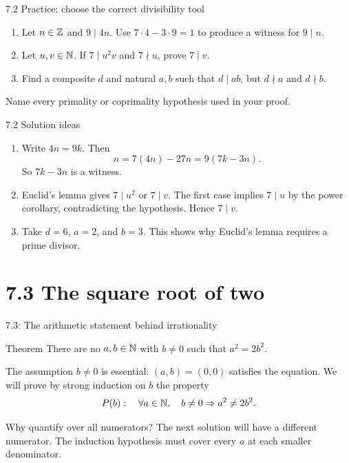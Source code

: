 \begin{frame}{7.2 Practice: choose the correct divisibility tool}
\begin{enumerate}
\item Let $n\in\mathbb{Z}$ and $9\mid4n$. Use $7\cdot4-3\cdot9=1$ to produce a witness for $9\mid n$.
\item Let $u,v\in\mathbb{N}$. If $7\mid u^2v$ and $7\nmid u$, prove $7\mid v$.
\item Find a composite $d$ and natural $a,b$ such that $d\mid ab$, but $d\nmid a$ and $d\nmid b$.
\end{enumerate}
Name every primality or coprimality hypothesis used in your proof.
\end{frame}

\begin{frame}{7.2 Solution ideas}
\begin{enumerate}
\item Write $4n=9k$. Then
\[
n=7(4n)-27n=9(7k-3n).
\]
So $7k-3n$ is a witness.
\item Euclid's lemma gives $7\mid u^2$ or $7\mid v$. The first case implies $7\mid u$ by the power corollary, contradicting the hypothesis. Hence $7\mid v$.
\item Take $d=6$, $a=2$, and $b=3$. This shows why Euclid's lemma requires a prime divisor.
\end{enumerate}
\end{frame}

\section{7.3 The square root of two}
\begin{frame}{7.3: The arithmetic statement behind irrationality}
\begin{block}{Theorem}
There are no $a,b\in\mathbb{N}$ with $b\ne0$ such that $a^2=2b^2$.
\end{block}
The assumption $b\ne0$ is essential: $(a,b)=(0,0)$ satisfies the equation.
\medskip
We will prove by strong induction on $b$ the property
\[
P(b):\quad\forall a\in\mathbb{N},\quad b\ne0\Rightarrow a^2\ne2b^2.
\]
\begin{block}{Why quantify over all numerators?}
The next solution will have a different numerator. The induction hypothesis must cover every $a$ at each smaller denominator.
\end{block}
\end{frame}


